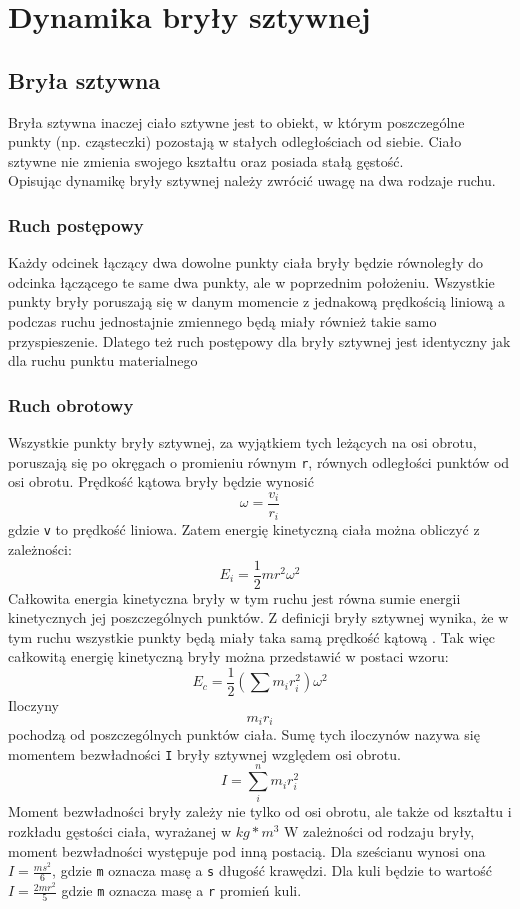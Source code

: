 \chapter{Dynamika bryły sztywnej}
\section{Bryła sztywna}
Bryła sztywna inaczej ciało sztywne jest to obiekt, w którym poszczególne punkty (np. cząsteczki) pozostają w stałych odległościach od siebie. Ciało sztywne nie zmienia swojego kształtu oraz posiada stałą gęstość.\\
Opisując dynamikę bryły sztywnej należy zwrócić uwagę na dwa rodzaje ruchu.
\subsection{Ruch postępowy}
Każdy odcinek łączący dwa dowolne punkty ciała bryły będzie równoległy do odcinka łączącego te same dwa punkty, ale w poprzednim położeniu. Wszystkie punkty bryły poruszają się w danym momencie z jednakową prędkością liniową a podczas ruchu jednostajnie zmiennego będą miały również takie samo przyspieszenie. Dlatego też ruch postępowy dla bryły sztywnej jest identyczny jak dla ruchu punktu materialnego
\subsection{Ruch obrotowy}
Wszystkie punkty bryły sztywnej, za wyjątkiem tych leżących na osi obrotu, poruszają się po okręgach o promieniu równym \verb$r$, równych odległości punktów od osi obrotu. Prędkość kątowa bryły będzie wynosić\begin{equation}\omega=\frac{v_i}{r_i}\end{equation}
gdzie \verb$v$ to prędkość liniowa. Zatem energię kinetyczną ciała można obliczyć z zależności:
\begin{equation}E_i=\frac{1}{2}mr^2\omega^2\end{equation}
Całkowita energia kinetyczna bryły w tym ruchu jest równa sumie energii kinetycznych jej poszczególnych punktów. Z definicji bryły sztywnej wynika, że w tym ruchu wszystkie punkty będą miały taka samą prędkość kątową . Tak więc całkowitą energię kinetyczną bryły można przedstawić w postaci wzoru:
\begin{equation}E_c=\frac{1}{2}(\sum m_i r_i^2)\omega^2\end{equation}
Iloczyny \begin{equation}m_i r_i\end{equation} pochodzą od poszczególnych punktów ciała. Sumę tych iloczynów nazywa się momentem bezwładności \verb$I$ bryły sztywnej względem osi obrotu.
\begin{equation}I=\sum_i^n m_i r_i^2\end{equation}
Moment bezwładności bryły zależy nie tylko od osi obrotu, ale także od kształtu i rozkładu gęstości ciała, wyrażanej w $kg * {m}^{3}$
W zależności od rodzaju bryły, moment bezwładności występuje pod inną postacią. Dla sześcianu wynosi ona $I=\frac{ms^2}{6}$, gdzie \verb$m$ oznacza masę a \verb$s$ długość krawędzi. Dla kuli będzie to wartość $I=\frac{2mr^2}{5}$ gdzie \verb$m$ oznacza masę a \verb$r$ promień kuli\cite{wiki2}.

